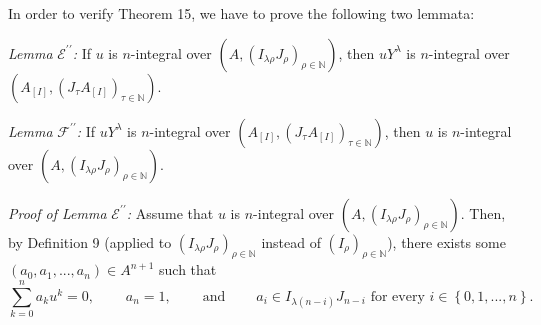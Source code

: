 \documentclass[12pt,final,notitlepage,onecolumn]{article}%
\begin{document}
In order to verify Theorem 15, we have to prove the following two lemmata:

\textit{Lemma }$\mathcal{E}^{\prime\prime}$\textit{:} If $u$ is $n$-integral
over $\left(  A,\left(  I_{\lambda\rho}J_{\rho}\right)  _{\rho\in\mathbb{N}%
}\right)  $, then $uY^{\lambda}$ is $n$-integral over $\left(  A_{\left[
I\right]  },\left(  J_{\tau}A_{\left[  I\right]  }\right)  _{\tau\in
\mathbb{N}}\right)  $.

\textit{Lemma} $\mathcal{F}^{\prime\prime}$\textit{:} If $uY^{\lambda}$ is
$n$-integral over $\left(  A_{\left[  I\right]  },\left(  J_{\tau}A_{\left[
I\right]  }\right)  _{\tau\in\mathbb{N}}\right)  $, then $u$ is $n$-integral
over $\left(  A,\left(  I_{\lambda\rho}J_{\rho}\right)  _{\rho\in\mathbb{N}%
}\right)  $.

\textit{Proof of Lemma }$\mathcal{E}^{\prime\prime}$\textit{:} Assume that $u$
is $n$-integral over $\left(  A,\left(  I_{\lambda\rho}J_{\rho}\right)
_{\rho\in\mathbb{N}}\right)  $. Then, by Definition 9 (applied to $\left(
I_{\lambda\rho}J_{\rho}\right)  _{\rho\in\mathbb{N}}$ instead of $\left(
I_{\rho}\right)  _{\rho\in\mathbb{N}}$), there exists some $\left(
a_{0},a_{1},...,a_{n}\right)  \in A^{n+1}$ such that%
\[
\sum\limits_{k=0}^{n}a_{k}u^{k}=0,\ \ \ \ \ \ \ \ \ \ a_{n}%
=1,\ \ \ \ \ \ \ \ \ \ \text{and}\ \ \ \ \ \ \ \ \ \ a_{i}\in I_{\lambda
\left(  n-i\right)  }J_{n-i}\text{ for every }i\in\left\{  0,1,...,n\right\}
.
\]
\end{document}
